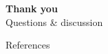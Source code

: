 \documentclass{KAIST-slide}
\begin{document}
\begin{frame}{}
    \centering
    \vfill
    {\fontsize{22}{26}\selectfont \textcolor{islcteal}{\textbf{Thank you}}}\\[4mm]
    {\large Questions \& discussion}
    \vfill
\end{frame}
\begin{frame}[allowframebreaks=0.9]{References}
    
    
    \framebreak
\end{frame}
\end{document}
